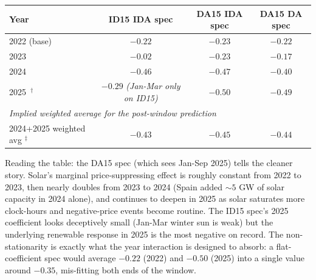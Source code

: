 \documentclass[11pt,a4paper]{article}
\theoremstyle{definition}
\theoremstyle{remark}
\theoremstyle{plain}
\begin{document}
\begin{center}
\footnotesize
\setlength{\tabcolsep}{7pt}
\begin{tabular}{l c c c}
\toprule
\textbf{Year} & \textbf{ID15 IDA spec} & \textbf{DA15 IDA spec} & \textbf{DA15 DA spec} \\
\midrule
2022 (base)   & $-0.22$ & $-0.23$ & $-0.22$ \\
2023          & $-0.02$ & $-0.23$ & $-0.17$ \\
2024          & $\mathbf{-0.46}$ & $\mathbf{-0.47}$ & $\mathbf{-0.40}$ \\
2025\, $^{\dagger}$ & $\mathbf{-0.29}$ \emph{(Jan-Mar only on ID15)} & $\mathbf{-0.50}$ & $\mathbf{-0.49}$ \\
\midrule
\multicolumn{4}{l}{\emph{Implied weighted average for the post-window prediction}} \\
2024+2025 weighted avg $^{\ddagger}$ & $-0.43$ & $-0.45$ & $-0.44$ \\
\bottomrule
\end{tabular}
\label{tab:solar-year-coefs}
\end{center}

Reading the table: the DA15 spec (which sees Jan-Sep 2025) tells the cleaner story. Solar's marginal price-suppressing effect is roughly constant from 2022 to 2023, then nearly doubles from 2023 to 2024 (Spain added $\sim\!5$ GW of solar capacity in 2024 alone), and continues to deepen in 2025 as solar saturates more clock-hours and negative-price events become routine. The ID15 spec's 2025 coefficient looks deceptively small (Jan-Mar winter sun is weak) but the underlying renewable response in 2025 is the most negative on record. The non-stationarity is exactly what the year interaction is designed to absorb: a flat-coefficient spec would average $-0.22$ (2022) and $-0.50$ (2025) into a single value around $-0.35$, mis-fitting both ends of the window.
\end{document}
